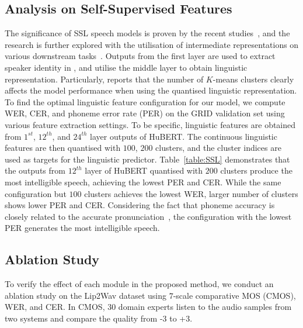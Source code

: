 \documentclass[letterpaper]{article} %
\begin{document}
\subsection{Analysis on Self-Supervised Features}
The significance of SSL speech models is proven by the recent studies~\cite{baevski2020wav2vec,hsu2021hubert}, and the research is further explored with the utilisation of intermediate representations on various downstream tasks~\cite{yang21c_interspeech,chang2022distilhubert}.
Outputs from the first layer are used to extract speaker identity in \cite{fan2020exploring,choi2021neural}, and \cite{lakhotia2021generative,lee2022hierspeech} utilise the middle layer to obtain linguistic representation.
Particularly, \cite{lakhotia2021generative} reports that the number of $K$-means clusters clearly affects the model performance when using the quantised linguistic representation.  To find the optimal linguistic feature configuration for our model, we compute WER, CER, and phoneme error rate (PER) on the GRID validation set using various feature extraction settings.
To be specific, linguistic features are obtained from $1^{st}$, $12^{th}$, and $24^{th}$ layer outputs of HuBERT. The continuous linguistic features are then quantised with $100$, $200$ clusters, and the cluster indices are used as targets for the linguistic predictor.
Table~\ref{table:SSL} demonstrates that the outputs from $12^{th}$ layer of HuBERT quantised with $200$ clusters produce the most intelligible speech, achieving the lowest PER and CER.
While the same configuration but $100$ clusters achieves the lowest WER, larger number of clusters shows lower PER and CER. Considering the fact that phoneme accuracy is closely related to the accurate pronunciation~\cite{zhang2022mixed}, the configuration with the lowest PER generates the most intelligible speech.

\subsection{Ablation Study}
\label{sec:ablation}

To verify the effect of each module in the proposed method, we conduct an ablation study on the Lip2Wav dataset using $7$-scale comparative MOS (CMOS), WER, and CER.
In CMOS, 30 domain experts listen to the audio samples from two systems and compare the quality from -$3$ to +$3$.
\end{document}
